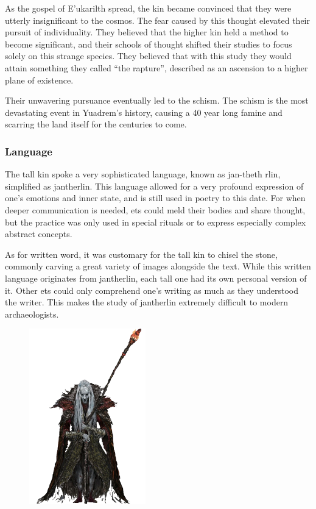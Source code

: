 As the gospel of E'ukarilth spread, the kin became convinced that they were utterly insignificant to the cosmos.
The fear caused by this thought elevated their pursuit of individuality.
They believed that the higher kin held a method to become significant, and their schools of thought shifted their studies to focus solely on this strange species.
They believed that with this study they would attain something they called ``the rapture'', described as an ascension to a higher plane of existence.

Their unwavering pursuance eventually led to the schism.
The schism is the most devastating event in Yuadrem's history, causing a 40 year long famine and scarring the land itself for the centuries to come.

\subsubsection{Language}
The tall kin spoke a very sophisticated language, known as jan-theth rlin, simplified as jantherlin.
This language allowed for a very profound expression of one's emotions and inner state, and is still used in poetry to this date.
For when deeper communication is needed, ets could meld their bodies and share thought, but the practice was only used in special rituals or to express especially complex abstract concepts.

As for written word, it was customary for the tall kin to chisel the stone, commonly carving a great variety of images alongside the text.
While this written language originates from jantherlin, each tall one had its own personal version of it.
Other ets could only comprehend one's writing as much as they understood the writer.
This makes the study of jantherlin extremely difficult to modern archaeologists.

\begin{figure}[t]
    \centering
    \includegraphics[width=0.45\textwidth]{03kins/img/10et_cleric.png}
\end{figure}

